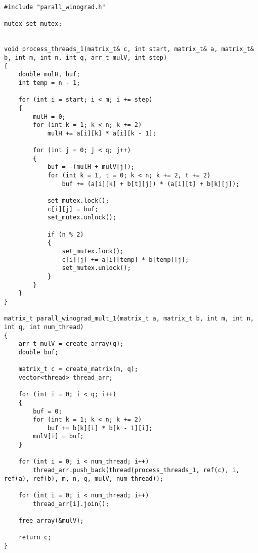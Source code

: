 \begin{lstlisting}[label=code2, caption = Распараллеленный алгоритм Винограда (1 вариант), captionpos=b]
#include "parall_winograd.h"

mutex set_mutex;


void process_threads_1(matrix_t& c, int start, matrix_t& a, matrix_t& b, int m, int n, int q, arr_t mulV, int step)
{
	double mulH, buf;
	int temp = n - 1;
	
	for (int i = start; i < m; i += step)
	{
		mulH = 0;
		for (int k = 1; k < n; k += 2)
			mulH += a[i][k] * a[i][k - 1];
		
		for (int j = 0; j < q; j++)
		{
			buf = -(mulH + mulV[j]);
			for (int k = 1, t = 0; k < n; k += 2, t += 2)
				buf += (a[i][k] + b[t][j]) * (a[i][t] + b[k][j]);
			
			set_mutex.lock();
			c[i][j] = buf;
			set_mutex.unlock();
			
			if (n % 2)
			{
				set_mutex.lock();
				c[i][j] += a[i][temp] * b[temp][j];
				set_mutex.unlock();
			}
		}
	}
}

matrix_t parall_winograd_mult_1(matrix_t a, matrix_t b, int m, int n, int q, int num_thread)
{
	arr_t mulV = create_array(q);
	double buf;
	
	matrix_t c = create_matrix(m, q);
	vector<thread> thread_arr;
	
	for (int i = 0; i < q; i++)
	{
		buf = 0;
		for (int k = 1; k < n; k += 2)
			buf += b[k][i] * b[k - 1][i];
		mulV[i] = buf;
	}
	
	for (int i = 0; i < num_thread; i++)
		thread_arr.push_back(thread(process_threads_1, ref(c), i, ref(a), ref(b), m, n, q, mulV, num_thread));
	
	for (int i = 0; i < num_thread; i++)
		thread_arr[i].join();
	
	free_array(&mulV);
	
	return c;
}

\end{lstlisting}


